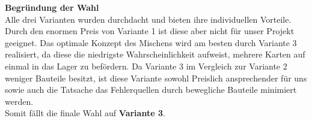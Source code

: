 \begin{table}[H]
    \centering
    \caption{Vergleich der Varianten}
\end{table}

\textbf{\large{Begründung der Wahl}}\\
Alle drei Varianten wurden durchdacht und bieten ihre individuellen Vorteile. Durch den enormen Preis von
Variante 1 ist diese aber nicht für unser Projekt geeignet. Das optimale Konzept des Mischens wird am besten durch
Variante 3 realisiert, da diese die niedrigste Wahrscheinlichkeit aufweist, mehrere Karten auf einmal in das Lager zu befördern.
Da Variante 3 im Vergleich zur Variante 2 weniger Bauteile besitzt, ist diese Variante sowohl Preislich ansprechender für uns
sowie auch die Tatsache das Fehlerquellen durch bewegliche Bauteile minimiert werden. \\
Somit fällt die finale Wahl auf \textbf{Variante 3}.



